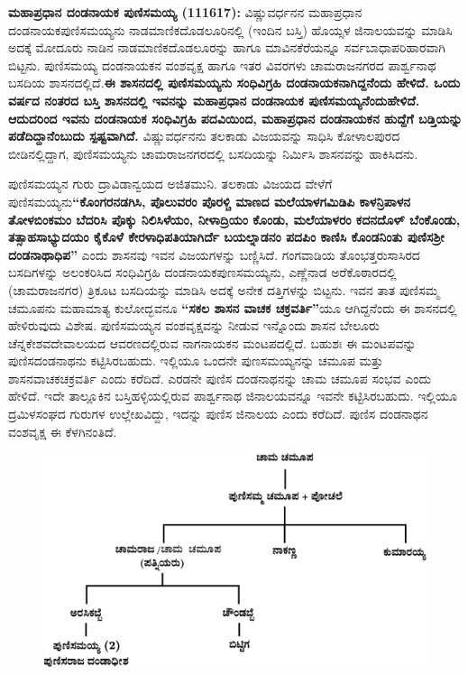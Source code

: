 \textbf{ಮಹಾಪ್ರಧಾನ ದಂಡನಾಯಕ ಪುಣಿಸಮಯ್ಯ (1116\general{\enginline{-}}17): }ವಿಷ್ಣುವರ್ಧನನ ಮಹಾಪ್ರಧಾನ ದಂಡನಾಯಕ\break ಪುಣಿಸಮಯ್ಯನು ನಾಡಮಾಣಿಕದೊಡಲೂರಿನಲ್ಲಿ (ಇಂದಿನ ಬಸ್ತಿ) ಹೊಯ್ಸಳ ಜಿನಾಲಯವನ್ನು ಮಾಡಿಸಿ ಅದಕ್ಕೆ ಮೋದೂರು ನಾಡಿನ ನಾಡಮಾಣಿಕದೊಡಲೂರನ್ನು ಹಾಗೂ ಮಾವಿನಕೆರೆಯನ್ನೂ ಸರ್ವಬಾಧಾಪರಿಹಾರವಾಗಿ ಬಿಟ್ಟನು. ಪುಣಿಸಮಯ್ಯ ದಂಡನಾಯಕನ ವಂಶವೃಕ್ಷ ಹಾಗೂ ಇತರ ವಿವರಗಳು ಚಾಮರಾಜನಗರದ ಪಾರ್ಶ್ವನಾಥ ಬಸದಿಯ ಶಾಸನದಲ್ಲಿದೆ.\textbf{ಈ ಶಾಸನದಲ್ಲಿ ಪುಣಿಸಮಯ್ಯನು ಸಂಧಿವಿಗ್ರಹಿ ದಂಡನಾಯಕನಾಗಿದ್ದನೆಂದು ಹೇಳಿದೆ. ಒಂದು ವರ್ಷದ ನಂತರದ ಬಸ್ತಿ ಶಾಸನದಲ್ಲಿ ಇವನನ್ನು ಮಹಾಪ್ರಧಾನ ದಂಡನಾಯಕ ಪುಣಿಸಮಯ್ಯನೆಂದುಹೇಳಿದೆ. ಆದುದರಿಂದ ಇವನು ದಂಡನಾಯಕ ಸಂಧಿವಿಗ್ರಹಿ ಪದವಿಯಿಂದ, ಮಹಾಪ್ರಧಾನ ದಂಡನಾಯಕನ ಹುದ್ದೆಗೆ ಬಡ್ತಿಯನ್ನು ಪಡೆದಿದ್ದಾನೆಂಬುದು ಸ್ಪಷ್ಟವಾಗಿದೆ.} ವಿಷ್ಣುವರ್ಧನನು ತಲಕಾಡು ವಿಜಯವನ್ನು ಸಾಧಿಸಿ ಕೋಳಾಲಪುರದ ಬೀಡಿನಲ್ಲಿದ್ದಾಗ, ಪುಣಿಸಮಯ್ಯನು ಚಾಮರಾಜನಗರದಲ್ಲಿ ಬಸದಿಯನ್ನು ನಿರ್ಮಿಸಿ ಶಾಸನವನ್ನು ಹಾಕಿಸಿದನು.

\newpage

ಪುಣಿಸಮಯ್ಯನ ಗುರು ದ್ರಾವಿಡಾನ್ವಯದ ಅಜಿತಮುನಿ. ತಲಕಾಡು ವಿಜಯದ ವೇಳೆಗೆ ಪುಣಿಸಮಯ್ಯನು\break \textbf{“ಕೊಂಗರನಡಗಿಸಿ, ಪೊಲುವರಂ ಪೊರಳ್ಚಿ ಮಾಣದ ಮಲೆಯಾಳಗಮಿಡಿಪಿ ಕಾಳನ್ರಿಪಾಳನ ತೋಳಬಿಂಕಮಂ ಬೆದರಿಸಿ ಪೊಕ್ಕು ನಿಲಿಸಿಳೆಯಂ, ನೀಳಾದ್ರಿಯಂ ಕೊಂಡು, ಮಲೆಯಾಳರಂ ಕದನದೊಳ್​ ಬೆಂಕೊಂಡು, ತತ್ಸಾಹಸಾಭ್ಯುದಯಂ ಕೈಕೊಳೆ\general{\break } ಕೇರಳಾಧಿಪತಿಯಾಗಿರ್ದೆ ಬಯಲ್ನಾಡನಂ ಪದಪಿಂ ಕಾಣಿಸಿ ಕೊಂಡನಿಂತು ಪುಣಿಸಶ‍್ರೀ ದಂಡನಾಥಾಧಿಪ”} ಎಂದು ಶಾಸನವು ಇವನ ವಿಜಯಗಳನ್ನು ಬಣ್ಣಿಸಿದೆ. ಗಂಗವಾಡಿಯ ತೊಂಭತ್ತರುಸಾಸಿರದ ಬಸದಿಗಳನ್ನು ಅಲಂಕರಿಸಿದ ಸಂಧಿವಿಗ್ರಹಿ ದಂಡನಾಯಕ\break ಪುಣಸಮಯ್ಯನು, ಎಣ್ಣೆನಾಡ ಅರೆಕೊಠಾರದಲ್ಲಿ (ಚಾಮರಾಜನಗರ) ತ್ರಿಕೂಟ ಬಸದಿಯನ್ನು ಮಾಡಿಸಿ ಅದಕ್ಕೆ ಅನೇಕ ದತ್ತಿಗಳನ್ನು ಬಿಟ್ಟನು. ಇವನ ತಾತ ಪುಣಿಸಮ್ಮ ಚಮೂಪನು ಮಹಾಮಾತ್ಯ ಕುಲೋದ್ಭವನೂ \textbf{“ಸಕಲ ಶಾಸನ ವಾಚಕ ಚಕ್ರವರ್ತಿ”}ಯೂ ಆಗಿದ್ದನೆಂದು ಈ ಶಾಸನದಲ್ಲಿ ಹೇಳಿರುವುದು ವಿಶೇಷ. ಪುಣಿಸಮಯ್ಯನ ವಂಶವೃಕ್ಷವನ್ನು ನೀಡುವ ಇನ್ನೊಂದು ಶಾಸನ ಬೇಲೂರು ಚೆನ್ನಕೇಶವದೇವಾಲಯದ ಆವರಣದಲ್ಲಿರುವ ನಾಗನಾಯಕನ ಮಂಟಪದಲ್ಲಿದೆ. ಬಹುಶಃ ಈ ಮಂಟಪವನ್ನು ಪುಣಿಸದಂಡನಾಥನು ಕಟ್ಟಿಸಿರಬಹುದು. ಇಲ್ಲಿಯೂ ಒಂದನೇ ಪುಣಸಮಯ್ಯನನ್ನು ಚಮೂಪ ಮತ್ತು ಶಾಸನವಾಚಕಚಕ್ರವರ್ತಿ ಎಂದು ಕರೆದಿದೆ. ಎರಡನೇ ಪುಣಿಸ ದಂಡನಾಥನನ್ನು ಚಾಮ ಚಮೂಪ ಸಂಭವ ಎಂದು ಹೇಳಿದೆ. ಇದೇ ತಾಲ್ಲೂಕಿನ ಬಸ್ತಿಹಳ್ಳಿಯಲ್ಲಿರುವ ಪಾರ್ಶ್ವನಾಥ ಜಿನಾಲಯವನ್ನೂ ಇವನೇ ಕಟ್ಟಿಸಿರಬಹುದು. ಇಲ್ಲಿಯೂ ದ್ರಮಿಳಸಂಘದ ಗುರುಗಳ ಉಲ್ಲೇಖವಿದ್ದು, ಇದನ್ನು ಪುಣಿಸ ಜಿನಾಲಯ ಎಂದು ಕರೆದಿದೆ. ಪುಣಿಸ ದಂಡನಾಥನ ವಂಶವೃಕ್ಷ ಈ ಕೆಳಗಿನಂತಿದೆ.

\begin{figure}[!h]
\includegraphics[scale=1.15]{images/chap3/chap3fig16.jpeg}
\end{figure}

